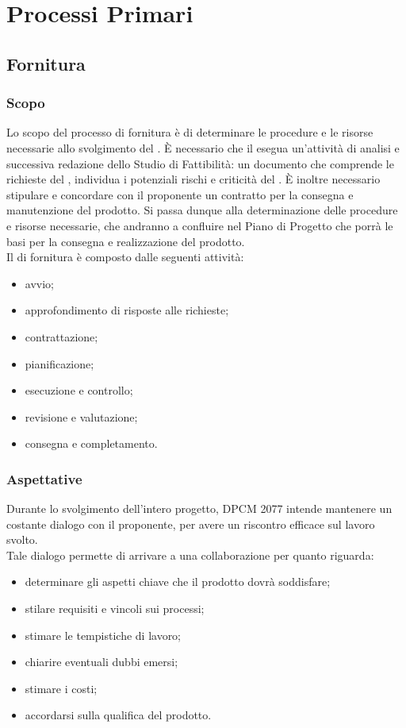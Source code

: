 \section{Processi Primari}
	\subsection{Fornitura}
		\subsubsection{Scopo}
		Lo scopo del processo di fornitura è di determinare le procedure e le risorse necessarie allo
		svolgimento del . È necessario che il  esegua un'attività di analisi e successiva redazione dello Studio di Fattibilità: un documento che comprende le richieste del , individua i potenziali rischi e criticità del .
		È inoltre necessario stipulare e concordare con il proponente un contratto per la consegna e manutenzione del prodotto. 
		Si passa dunque alla determinazione delle procedure e risorse necessarie, che andranno a confluire nel Piano di Progetto che porrà le basi per la consegna e realizzazione del prodotto.
		\\
		Il  di fornitura è composto dalle seguenti attività:
		\begin{itemize}
			\item avvio;
			\item approfondimento di risposte alle richieste;
			\item contrattazione;
			\item pianificazione;
			\item esecuzione e controllo;
			\item revisione e valutazione;
			\item consegna e completamento.
		\end{itemize}
		\subsubsection{Aspettative}
		Durante lo svolgimento dell'intero progetto, DPCM 2077 intende mantenere un costante dialogo con il proponente, per avere un riscontro efficace sul lavoro svolto.
		\\
		Tale dialogo permette di arrivare a una collaborazione per quanto riguarda:
		\begin{itemize}
			\item determinare gli aspetti chiave che il prodotto dovrà soddisfare;
			\item stilare requisiti e vincoli sui processi;
			\item stimare le tempistiche di lavoro;
			\item chiarire eventuali dubbi emersi;
			\item stimare i costi;
			\item accordarsi sulla qualifica del prodotto.
		\end{itemize}
